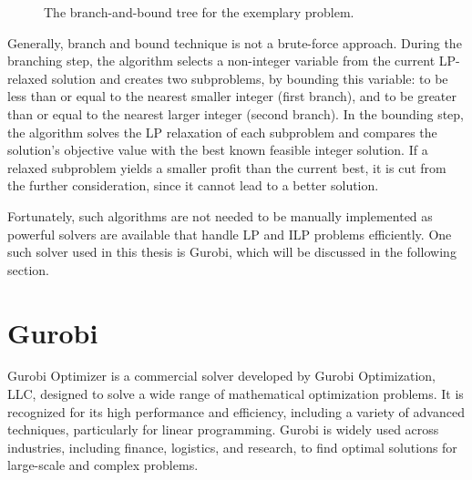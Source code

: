 \documentclass[magisterska,en]{pracamgr}
\begin{document}
\begin{figure}[h!]
    \centering

    \caption{The branch-and-bound tree for the exemplary problem.}
    \label{branch-and-bound-tree}
\end{figure}

Generally, branch and bound technique is not a brute-force approach. During the branching step, the algorithm selects a non-integer variable from the current LP-relaxed solution and creates two subproblems, by bounding this variable: to be less than or equal to the nearest smaller integer (first branch), and to be greater than or equal to the nearest larger integer (second branch). In the bounding step, the algorithm solves the LP relaxation of each subproblem and compares the solution's objective value with the best known feasible integer solution. If a relaxed subproblem yields a smaller profit than the current best, it is cut from the further consideration, since it cannot lead to a better solution.

Fortunately, such algorithms are not needed to be manually implemented as powerful solvers are available that handle LP and ILP problems efficiently. One such solver used in this thesis is Gurobi, which will be discussed in the following section.

\section{Gurobi}

Gurobi Optimizer is a commercial solver developed by Gurobi Optimization, LLC, designed to solve a wide range of mathematical optimization problems. It is recognized for its high performance and efficiency, including a variety of advanced techniques, particularly for linear programming. Gurobi is widely used across industries, including finance, logistics, and research, to find optimal solutions for large-scale and complex problems.
\end{document}
